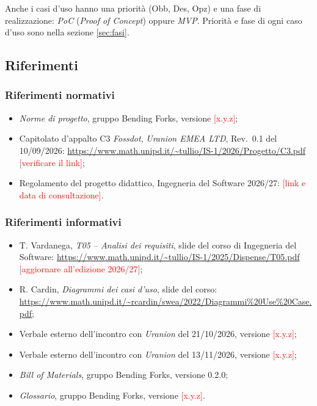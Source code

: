 \documentclass[12pt,a4paper]{article}
\newcommand{\ph}[1]{\textcolor{red}{[#1]}}
\newcommand{\tightlist}{\setlength{\itemsep}{1pt}\setlength{\parskip}{0pt}}
\begin{document}
Anche i casi d'uso hanno una priorità (Obb, Des, Opz) e una fase di realizzazione: \emph{PoC} (\emph{Proof of Concept}) oppure \emph{MVP}. Priorità e fase di ogni caso d'uso sono nella sezione \ref{sec:fasi}.

\subsection{Riferimenti}

\subsubsection{Riferimenti normativi}
\begin{itemize}
\tightlist
\item \emph{Norme di progetto}, gruppo Bending Forks, versione \ph{x.y.z};
\item Capitolato d'appalto C3 \emph{Fossdot}, \emph{Uranion EMEA LTD}, Rev.~0.1 del 10/09/2026: \url{https://www.math.unipd.it/~tullio/IS-1/2026/Progetto/C3.pdf} \ph{verificare il link};
\item Regolamento del progetto didattico, Ingegneria del Software 2026/27: \ph{link e data di consultazione}.
\end{itemize}

\subsubsection{Riferimenti informativi}
\begin{itemize}
\tightlist
\item T. Vardanega, \emph{T05 -- Analisi dei requisiti}, slide del corso di Ingegneria del Software: \url{https://www.math.unipd.it/~tullio/IS-1/2025/Dispense/T05.pdf} \ph{aggiornare all'edizione 2026/27};
\item R. Cardin, \emph{Diagrammi dei casi d'uso}, slide del corso: \url{https://www.math.unipd.it/~rcardin/swea/2022/Diagrammi\%20Use\%20Case.pdf};
\item Verbale esterno dell'incontro con \emph{Uranion} del 21/10/2026, versione \ph{x.y.z};
\item Verbale esterno dell'incontro con \emph{Uranion} del 13/11/2026, versione \ph{x.y.z};
\item \emph{Bill of Materials}, gruppo Bending Forks, versione 0.2.0;
\item \emph{Glossario}, gruppo Bending Forks, versione \ph{x.y.z}.
\end{itemize}
\end{document}
